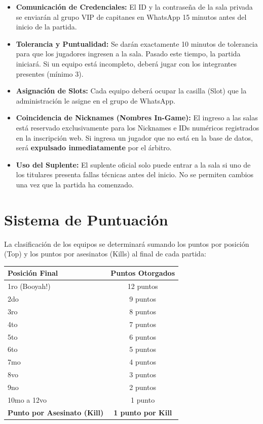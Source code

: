 \documentclass[11pt, a4paper]{article}
\begin{document}
\begin{itemize}
    \item \textbf{Comunicación de Credenciales:} El ID y la contraseña de la sala privada se enviarán al grupo VIP de capitanes en WhatsApp 15 minutos antes del inicio de la partida.
    \item \textbf{Tolerancia y Puntualidad:} Se darán exactamente 10 minutos de tolerancia para que los jugadores ingresen a la sala. Pasado este tiempo, la partida iniciará. Si un equipo está incompleto, deberá jugar con los integrantes presentes (mínimo 3).
    \item \textbf{Asignación de Slots:} Cada equipo deberá ocupar la casilla (Slot) que la administración le asigne en el grupo de WhatsApp.
    \item \textbf{Coincidencia de Nicknames (Nombres In-Game):} El ingreso a las salas está reservado exclusivamente para los Nicknames e IDs numéricos registrados en la inscripción web. Si ingresa un jugador que no está en la base de datos, será \textbf{expulsado inmediatamente} por el árbitro.
    \item \textbf{Uso del Suplente:} El suplente oficial solo puede entrar a la sala si uno de los titulares presenta fallas técnicas antes del inicio. No se permiten cambios una vez que la partida ha comenzado.
\end{itemize}

\section{Sistema de Puntuación}
La clasificación de los equipos se determinará sumando los puntos por posición (Top) y los puntos por asesinatos (Kills) al final de cada partida:

\vspace{0.3cm}
\begin{table}[h]
\centering
\begin{tabular}{lc}
\toprule
\textbf{Posición Final} & \textbf{Puntos Otorgados} \\
\midrule
1ro (Booyah!) & 12 puntos \\
2do & 9 puntos \\
3ro & 8 puntos \\
4to & 7 puntos \\
5to & 6 puntos \\
6to & 5 puntos \\
7mo & 4 puntos \\
8vo & 3 puntos \\
9no & 2 puntos \\
10mo a 12vo & 1 punto \\
\midrule
\textbf{Punto por Asesinato (Kill)} & \textbf{1 punto por Kill} \\
\bottomrule
\end{tabular}
\end{table}
\vspace{0.3cm}
\end{document}
